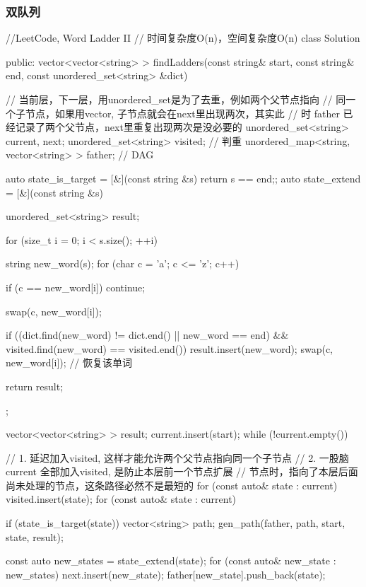 \subsubsection{双队列}

\begin{Code}
//LeetCode, Word Ladder II
// 时间复杂度O(n)，空间复杂度O(n)
class Solution {
public:
    vector<vector<string> > findLadders(const string& start,
            const string& end, const unordered_set<string> &dict) {
        // 当前层，下一层，用unordered_set是为了去重，例如两个父节点指向
        // 同一个子节点，如果用vector, 子节点就会在next里出现两次，其实此
        // 时 father 已经记录了两个父节点，next里重复出现两次是没必要的
        unordered_set<string> current, next;
        unordered_set<string> visited; // 判重
        unordered_map<string, vector<string> > father; // DAG

        auto state_is_target = [&](const string &s) {return s == end;};
        auto state_extend = [&](const string &s) {
            unordered_set<string> result;

            for (size_t i = 0; i < s.size(); ++i) {
                string new_word(s);
                for (char c = 'a'; c <= 'z'; c++) {
                    if (c == new_word[i]) continue;

                    swap(c, new_word[i]);

                    if ((dict.find(new_word) != dict.end() || new_word == end) &&
                             visited.find(new_word) == visited.end()) {
                        result.insert(new_word);
                    }
                    swap(c, new_word[i]); // 恢复该单词
                }
            }

            return result;
        };

        vector<vector<string> > result;
        current.insert(start);
        while (!current.empty()) {
            // 1. 延迟加入visited, 这样才能允许两个父节点指向同一个子节点
            // 2. 一股脑current 全部加入visited, 是防止本层前一个节点扩展
            // 节点时，指向了本层后面尚未处理的节点，这条路径必然不是最短的
            for (const auto& state : current)
                visited.insert(state);
            for (const auto& state : current) {
                if (state_is_target(state)) {
                    vector<string> path;
                    gen_path(father, path, start, state, result);
                }

                const auto new_states = state_extend(state);
                for (const auto& new_state : new_states) {
                    next.insert(new_state);
                    father[new_state].push_back(state);
                }
            }

}}}
\end{Code}
